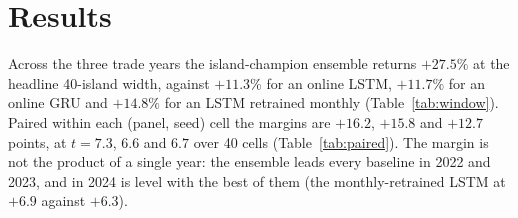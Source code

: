 %
%
%
\providecommand{\se}[1]{{\scriptsize$\pm$#1}}
\providecommand{\toprule}{\hline}
\providecommand{\midrule}{\hline}
\providecommand{\bottomrule}{\hline}

\section{Results}

Across the three trade years the island-champion ensemble returns
$+27.5\%$ at the headline 40-island width, against $+11.3\%$ for an
online LSTM, $+11.7\%$ for an online GRU and $+14.8\%$ for an LSTM
retrained monthly (Table~\ref{tab:window}). Paired within each (panel,
seed) cell the margins are $+16.2$, $+15.8$ and $+12.7$ points, at
$t=7.3$, $6.6$ and $6.7$ over 40 cells (Table~\ref{tab:paired}). The
margin is not the product of a single year: the ensemble leads every
baseline in 2022 and 2023, and in 2024 is level with the best of them
(the monthly-retrained LSTM at $+6.9$ against $+6.3$).


